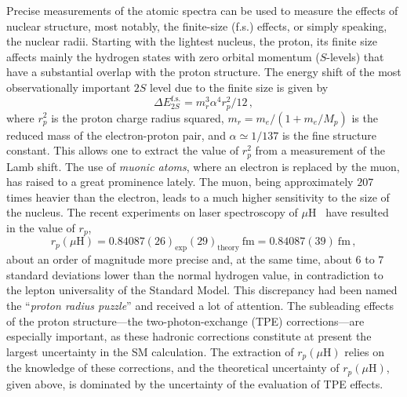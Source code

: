 \documentclass[prl,
twocolumn,
showpacs,preprintnumbers,amsmath,amssymb,
superscriptaddress,
a4paper,nofootinbib,longbibliography]{revtex4-2}
\begin{document}
Precise measurements of the atomic spectra can be used to measure the effects of nuclear structure, most notably, the
finite-size (f.s.) effects, or simply speaking, the nuclear radii.
Starting with the lightest nucleus, the proton, its finite size affects mainly the hydrogen states with zero orbital momentum ($S$-levels) that have a substantial overlap with the proton structure. The energy shift of the most observationally important $2S$ level due to the
finite size is given by
\begin{equation}
\Delta E^\text{f.s.}_{2S}=m_r^3\alpha^4r_p^2/12\,,
\label{eq:finite_size_energy}
\end{equation}
where $r_p^2$ is the proton charge radius squared, $m_r=m_e/(1+m_e/M_p)$ is the reduced mass of the electron-proton pair,
and $\alpha\simeq 1/137$ is the fine structure constant. This allows one to extract the value of $r_p^2$ from a measurement of the Lamb shift. 
The use of {\it muonic atoms}, where an electron is replaced by the muon, has raised to a great prominence lately. The muon, being approximately $207$ times heavier than the electron,
leads to a much higher sensitivity to the size of the nucleus.
The recent experiments on laser spectroscopy of $\mu$H~\cite{Pohl:2010zza,Antognini:1900ns}
have resulted in the value of $r_p$,
\begin{equation}
r_p(\mu \text{H})=0.84087(26)_\text{exp}(29)_\text{theory}\ \text{fm}=0.84087(39)\ \text{fm}\,,
\label{eq:rmuh}
\end{equation}
about an order of magnitude more precise and, at the same time, 
about $6$ to $7$ standard deviations lower than the normal hydrogen value, in contradiction
to the lepton universality of the Standard Model.
This discrepancy had been named the ``{\it proton radius puzzle}''
and received a lot of attention.
The subleading effects of the proton structure---the two-photon-exchange (TPE) corrections---are
especially important, as these hadronic corrections constitute at present the largest uncertainty in the SM calculation.
The extraction of $r_p(\mu \text{H})$ relies on the knowledge of these corrections, and the theoretical
uncertainty of $r_p(\mu \text{H})$, given above, is dominated by the uncertainty of the evaluation of TPE effects.
\end{document}
